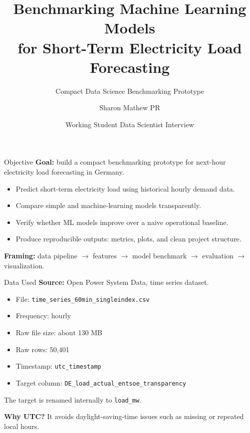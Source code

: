 \documentclass[aspectratio=169]{beamer}
\title[Electricity Load Forecasting Benchmark]{Benchmarking Machine Learning Models\\for Short-Term Electricity Load Forecasting}
\subtitle{Compact Data Science Benchmarking Prototype}
\author{Sharon Mathew PR}
\institute{M.Sc. Computational and Applied Mathematics, FAU}
\date{Working Student Data Scientist Interview}
\begin{document}
\begin{frame}
    \titlepage
\end{frame}

\begin{frame}{Objective}
    \textbf{Goal:} build a compact benchmarking prototype for next-hour electricity load forecasting in Germany.

    \vspace{0.4cm}
    \begin{itemize}
        \item Predict short-term electricity load using historical hourly demand data.
        \item Compare simple and machine-learning models transparently.
        \item Verify whether ML models improve over a naive operational baseline.
        \item Produce reproducible outputs: metrics, plots, and clean project structure.
    \end{itemize}

    \vspace{0.3cm}
    \textbf{Framing:} data pipeline $\rightarrow$ features $\rightarrow$ model benchmark $\rightarrow$ evaluation $\rightarrow$ visualization.
\end{frame}

\begin{frame}{Data Used}
    \textbf{Source:} Open Power System Data, time series dataset.

    \vspace{0.3cm}
    \begin{itemize}
        \item File: \texttt{time\_series\_60min\_singleindex.csv}
        \item Frequency: hourly
        \item Raw file size: about 130 MB
        \item Raw rows: 50,401
        \item Timestamp: \texttt{utc\_timestamp}
        \item Target column: \texttt{DE\_load\_actual\_entsoe\_transparency}
    \end{itemize}

    \vspace{0.3cm}
    The target is renamed internally to \texttt{load\_mw}.

    \vspace{0.2cm}
    \textbf{Why UTC?} It avoids daylight-saving-time issues such as missing or repeated local hours.
\end{frame}
\end{document}
